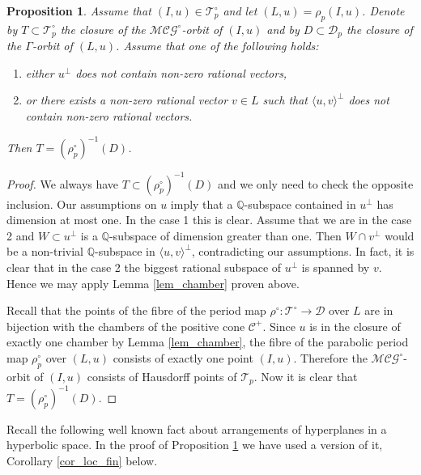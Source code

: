 \documentclass[11pt]{article}
\newcommand{\6}{\partial}
\newcommand{\bbQ}{\mathbb{Q}}
\newcommand{\CC}{\mathcal{C}}
\newcommand{\Teich}{\mathcal{T}}
\newcommand{\TeichP}{\Teich_p}
\newcommand{\MC}{\mathcal{MCG}}
\newcommand{\Dom}{\mathcal{D}}
\newcommand{\DomP}{\Dom_p}
\newcommand{\Per}{\rho}
\newcommand{\PerP}{\Per_p}
\newtheorem{prop}[defn]{Proposition}
\begin{document}
\begin{prop}\label{prop_density}
Assume that $(I,u)\in \TeichP^\circ$ and let $(L,u) = \PerP(I,u)$. Denote
by $T\subset \TeichP^\circ$ the closure of the $\MC^\circ$-orbit of $(I,u)$
and by $D\subset \DomP$ the closure of the $\Gamma$-orbit of $(L,u)$.
Assume that one of the following holds:
\begin{enumerate}
\item either $u^\perp$ does not contain non-zero rational vectors,
\item or there exists a non-zero rational vector $v\in L$ such that $\langle u,v\rangle^\perp$
does not contain non-zero rational vectors. 
\end{enumerate}
Then $T = (\PerP^{\circ})^{-1}(D)$. 
\end{prop}
\begin{proof}
We always have $T \subset (\PerP^{\circ})^{-1}(D)$ and we only need to check the opposite inclusion.
Our assumptions on $u$ imply that a $\bbQ$-subspace contained in $u^\perp$
has dimension at most one. In the case 1 this is clear. Assume that we are in the case 2
and $W\subset u^\perp$ is a $\bbQ$-subspace of dimension greater than one.
Then $W\cap v^\perp$ would be a non-trivial $\bbQ$-subspace
in $\langle u, v \rangle^\perp$, contradicting our assumptions. In fact, it is
clear that in the case 2 the biggest rational subspace of $u^\perp$ is spanned by $v$.
Hence we may apply Lemma \ref{lem_chamber} proven above.

Recall that the points of the fibre of the period map $\Per^\circ\colon \Teich^\circ\to\Dom$ over $L$
are in bijection with the chambers of the positive cone $\CC^+$. Since $u$ is in the closure
of exactly one chamber by Lemma \ref{lem_chamber}, the fibre of the parabolic period map $\PerP^\circ$ over $(L,u)$ consists of
exactly one point $(I,u)$. Therefore the $\MC^\circ$-orbit of $(I,u)$ consists of Hausdorff
points of $\TeichP$. Now it is clear that $T = (\PerP^{\circ})^{-1}(D)$.
\end{proof}

Recall the following well known fact about arrangements of hyperplanes in a hyperbolic space.
In the proof of Proposition \ref{prop_density} we have used a version of it, Corollary \ref{cor_loc_fin} below.
\end{document}
